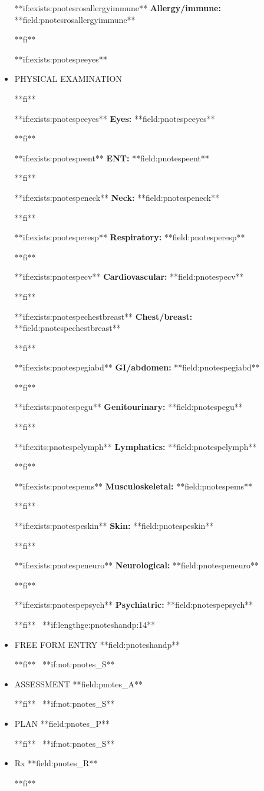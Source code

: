 \documentclass{article}
\newcommand{\sheading}[1]{\textbf{#1:}}
\begin{document}
\begin{itemize}
**if:exists:pnotesrosallergyimmune**
\sheading{Allergy/immune} **field:pnotesrosallergyimmune**
\par
**fi**

**if:exists:pnotespeeyes**
\
\item {PHYSICAL EXAMINATION}
\par
**fi**

**if:exists:pnotespeeyes**
\sheading{Eyes} **field:pnotespeeyes**
\par
**fi**

**if:exists:pnotespeent**
\sheading{ENT} **field:pnotespeent**
\par
**fi**

**if:exists:pnotespeneck**
\sheading{Neck} **field:pnotespeneck**
\par
**fi**

**if:exists:pnotesperesp**
\sheading{Respiratory} **field:pnotesperesp**
\par
**fi**

**if:exists:pnotespecv**
\sheading{Cardiovascular} **field:pnotespecv**
\par
**fi**

**if:exists:pnotespechestbreast**
\sheading{Chest/breast} **field:pnotespechestbreast**
\par
**fi**

**if:exists:pnotespegiabd**
\sheading{GI/abdomen} **field:pnotespegiabd**
\par
**fi**

**if:exists:pnotespegu**
\sheading{Genitourinary} **field:pnotespegu**
\par
**fi**

**if:exits:pnotespelymph**
\sheading{Lymphatics}  **field:pnotespelymph**
\par
**fi**


**if:exists:pnotespems**
\sheading{Musculoskeletal} **field:pnotespems**
\par
**fi**

**if:exists:pnotespeskin**
\sheading{Skin} **field:pnotespeskin**
\par
**fi**

**if:exists:pnotespeneuro**
\sheading{Neurological} **field:pnotespeneuro**
\par
**fi**

**if:exists:pnotespepsych**
\sheading{Psychiatric} **field:pnotespepsych**
\par
**fi**
\
**if:lengthge:pnoteshandp:14**
\item {FREE FORM ENTRY} **field:pnoteshandp**
\par
**fi**
\
**if:not:pnotes_S**
\item{ASSESSMENT} **field:pnotes_A**
\par
**fi**
\
**if:not:pnotes_S**
\item{PLAN} **field:pnotes_P**
\par
**fi**
\
**if:not:pnotes_S**
\item{Rx} **field:pnotes_R**
\par
**fi**


\end{itemize}
\end{document}
